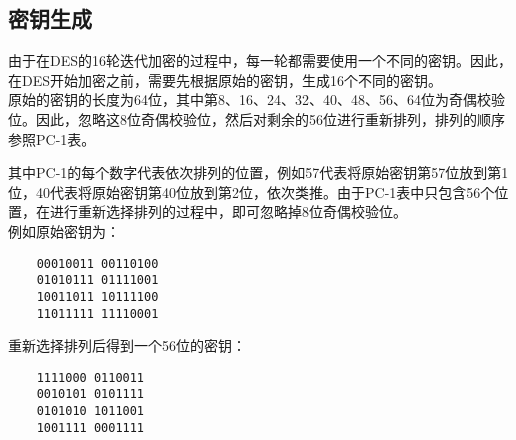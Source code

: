 \subsection{密钥生成}

由于在DES的16轮迭代加密的过程中，每一轮都需要使用一个不同的密钥。因此，在DES开始加密之前，需要先根据原始的密钥，生成16个不同的密钥。\\

原始的密钥的长度为64位，其中第8、16、24、32、40、48、56、64位为奇偶校验位。因此，忽略这8位奇偶校验位，然后对剩余的56位进行重新排列，排列的顺序参照PC-1表。\\

\begin{table}[H]
    \centering
    \caption{PC-1}
\end{table}

其中PC-1的每个数字代表依次排列的位置，例如57代表将原始密钥第57位放到第1位，40代表将原始密钥第40位放到第2位，依次类推。由于PC-1表中只包含56个位置，在进行重新选择排列的过程中，即可忽略掉8位奇偶校验位。\\

例如原始密钥为：

\begin{verbatim}
    00010011 00110100
    01010111 01111001
    10011011 10111100
    11011111 11110001
\end{verbatim}

重新选择排列后得到一个56位的密钥：

\begin{verbatim}
    1111000 0110011
    0010101 0101111
    0101010 1011001
    1001111 0001111
\end{verbatim}

